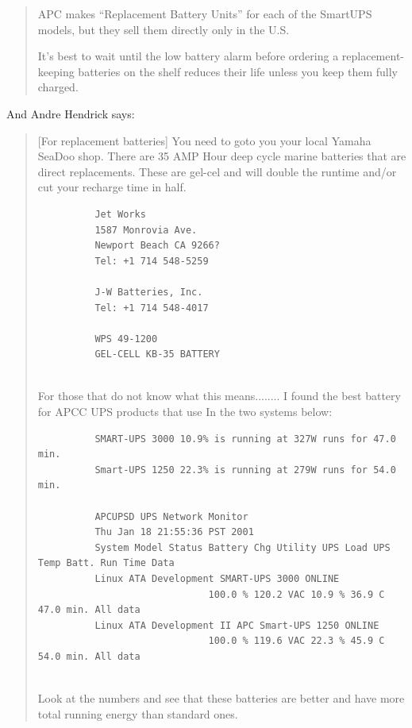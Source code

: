 {{{{{{\begin{quote}
APC makes ``Replacement Battery Units'' for each of the SmartUPS models, but
they sell them directly only in the U.S.  

It's best to wait until the low battery alarm before ordering a
replacement-keeping batteries on the shelf reduces their life unless you keep
them fully charged. 
\end{quote}

And Andre Hendrick says:  

\begin{quote}

[For replacement batteries] You need to goto you your local Yamaha SeaDoo
shop. There are 35 AMP Hour deep cycle marine batteries that are direct
replacements. These are gel-cel and will double the runtime and/or cut your
recharge time in half.  

\footnotesize
\begin{verbatim}
          Jet Works
          1587 Monrovia Ave.
          Newport Beach CA 9266?
          Tel: +1 714 548-5259
          
          J-W Batteries, Inc.
          Tel: +1 714 548-4017
          
          WPS 49-1200
          GEL-CELL KB-35 BATTERY
     
\end{verbatim}
\normalsize

For those that do not know what this means........ I found the best battery
for APCC UPS products that use In the two systems below:  

\footnotesize
\begin{verbatim}
          SMART-UPS 3000 10.9% is running at 327W runs for 47.0 min.
          Smart-UPS 1250 22.3% is running at 279W runs for 54.0 min.
          
          APCUPSD UPS Network Monitor
          Thu Jan 18 21:55:36 PST 2001
          System Model Status Battery Chg Utility UPS Load UPS Temp Batt. Run Time Data
          Linux ATA Development SMART-UPS 3000 ONLINE
                              100.0 % 120.2 VAC 10.9 % 36.9 C 47.0 min. All data
          Linux ATA Development II APC Smart-UPS 1250 ONLINE
                              100.0 % 119.6 VAC 22.3 % 45.9 C 54.0 min. All data
     
\end{verbatim}
\normalsize

Look at the numbers and see that these batteries are better and have more
total running energy than standard ones.  


\end{quote}}}}}}}
